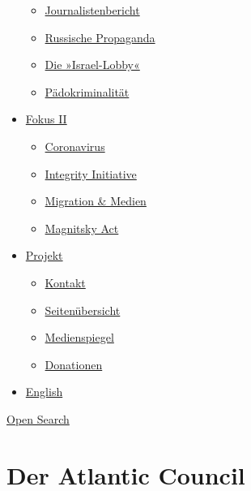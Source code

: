 \begin{itemize}
  \begin{itemize}
  \tightlist
  \item
    \href{https://swprs.org/bericht-eines-journalisten/}{Journalistenbericht}
  \item
    \href{https://swprs.org/russische-propaganda/}{Russische Propaganda}
  \item
    \href{https://swprs.org/die-israel-lobby-fakten-und-mythen/}{Die
    »Israel-Lobby«}
  \item
    \href{https://swprs.org/geopolitik-und-paedokriminalitaet/}{Pädokriminalität}
  \end{itemize}
\item
  \href{https://swprs.org/migration-und-medien/}{Fokus II}

  \begin{itemize}
  \tightlist
  \item
    \href{https://swprs.org/covid-19-hinweis-ii/}{Coronavirus}
  \item
    \href{https://swprs.org/die-integrity-initiative/}{Integrity
    Initiative}
  \item
    \href{https://swprs.org/migration-und-medien/}{Migration \& Medien}
  \item
    \href{https://swprs.org/der-fall-magnitsky/}{Magnitsky Act}
  \end{itemize}
\item
  \href{https://swprs.org/kontakt/}{Projekt}

  \begin{itemize}
  \tightlist
  \item
    \href{https://swprs.org/kontakt/}{Kontakt}
  \item
    \href{https://swprs.org/uebersicht/}{Seitenübersicht}
  \item
    \href{https://swprs.org/medienspiegel/}{Medienspiegel}
  \item
    \href{https://swprs.org/donationen/}{Donationen}
  \end{itemize}
\item
  \href{https://swprs.org/contact/}{English}
\end{itemize}

\protect\hyperlink{}{Open Search}

\hypertarget{der-atlantic-council}{%
\section{Der Atlantic Council}\label{der-atlantic-council}}

